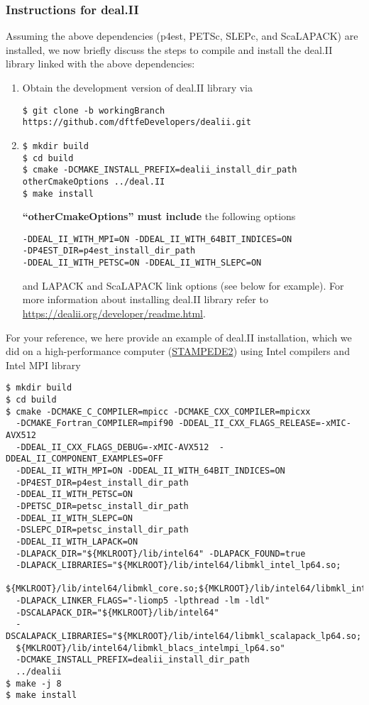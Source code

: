\subsubsection{Instructions for deal.II}
Assuming the above dependencies (p4est, PETSc, SLEPc, and ScaLAPACK) are installed, we now briefly discuss the steps to compile and install the deal.II library linked with the above dependencies:
\begin{enumerate}

\item Obtain the development version of deal.II library via
\begin{verbatim}
$ git clone -b workingBranch https://github.com/dftfeDevelopers/dealii.git
\end{verbatim}

\item
\begin{verbatim}
$ mkdir build
$ cd build
$ cmake -DCMAKE_INSTALL_PREFIX=dealii_install_dir_path otherCmakeOptions ../deal.II
$ make install
\end{verbatim}
{\bf ``otherCmakeOptions'' must include} the following options
\begin{verbatim}
-DDEAL_II_WITH_MPI=ON -DDEAL_II_WITH_64BIT_INDICES=ON
-DP4EST_DIR=p4est_install_dir_path
-DDEAL_II_WITH_PETSC=ON -DDEAL_II_WITH_SLEPC=ON
\end{verbatim}
and LAPACK and ScaLAPACK link options (see below for example). For more information about installing deal.II library refer to \url{https://dealii.org/developer/readme.html}.  
\end{enumerate}		
For your reference, we here provide an example of deal.II installation, which we did on a high-performance computer (\href{https://www.tacc.utexas.edu/systems/stampede2}{STAMPEDE2}) using Intel compilers and Intel MPI library
\begin{verbatim}
$ mkdir build
$ cd build
$ cmake -DCMAKE_C_COMPILER=mpicc -DCMAKE_CXX_COMPILER=mpicxx 
  -DCMAKE_Fortran_COMPILER=mpif90 -DDEAL_II_CXX_FLAGS_RELEASE=-xMIC-AVX512 
  -DDEAL_II_CXX_FLAGS_DEBUG=-xMIC-AVX512  -DDEAL_II_COMPONENT_EXAMPLES=OFF
  -DDEAL_II_WITH_MPI=ON -DDEAL_II_WITH_64BIT_INDICES=ON
  -DP4EST_DIR=p4est_install_dir_path
  -DDEAL_II_WITH_PETSC=ON 
  -DPETSC_DIR=petsc_install_dir_path
  -DDEAL_II_WITH_SLEPC=ON
  -DSLEPC_DIR=petsc_install_dir_path
  -DDEAL_II_WITH_LAPACK=ON
  -DLAPACK_DIR="${MKLROOT}/lib/intel64" -DLAPACK_FOUND=true
  -DLAPACK_LIBRARIES="${MKLROOT}/lib/intel64/libmkl_intel_lp64.so;
  ${MKLROOT}/lib/intel64/libmkl_core.so;${MKLROOT}/lib/intel64/libmkl_intel_thread.so" 
  -DLAPACK_LINKER_FLAGS="-liomp5 -lpthread -lm -ldl"
  -DSCALAPACK_DIR="${MKLROOT}/lib/intel64"
  -DSCALAPACK_LIBRARIES="${MKLROOT}/lib/intel64/libmkl_scalapack_lp64.so;
  ${MKLROOT}/lib/intel64/libmkl_blacs_intelmpi_lp64.so"
  -DCMAKE_INSTALL_PREFIX=dealii_install_dir_path
  ../dealii
$ make -j 8
$ make install
\end{verbatim}

